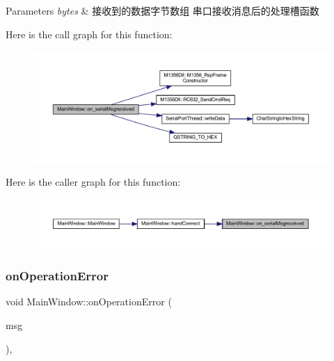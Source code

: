 \begin{DoxyParams}{Parameters}
{\em bytes} & 接收到的数据字节数组 串口接收消息后的处理槽函数 \\
\hline
\end{DoxyParams}
Here is the call graph for this function\+:
\nopagebreak
\begin{figure}[H]
\begin{center}
\leavevmode
\includegraphics[width=350pt]{class_main_window_a13d0382dd96e94f56a05300323d278da_cgraph}
\end{center}
\end{figure}
Here is the caller graph for this function\+:
\nopagebreak
\begin{figure}[H]
\begin{center}
\leavevmode
\includegraphics[width=350pt]{class_main_window_a13d0382dd96e94f56a05300323d278da_icgraph}
\end{center}
\end{figure}
\mbox{\label{class_main_window_afa5d14c3c19a3ce9a57a63f32d7b6af5}} 
\subsubsection{\texorpdfstring{onOperationError}{onOperationError}}
{\footnotesize\ttfamily void Main\+Window\+::on\+Operation\+Error (\begin{DoxyParamCaption}\item[{Q\+String}]{msg }\end{DoxyParamCaption})\hspace{0.3cm}{\ttfamily [private]}, {\ttfamily [slot]}}



